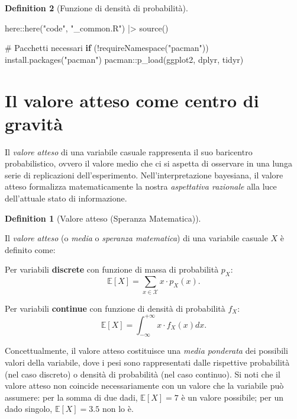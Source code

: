 \documentclass[
  letterpaper,
  DIV=11,
  numbers=noendperiod,
  oneside]{scrreprt}
\newenvironment{Shaded}{\begin{snugshade}}{\end{snugshade}}
\newcommand{\CommentTok}[1]{\textcolor[rgb]{0.37,0.37,0.37}{#1}}
\newcommand{\ControlFlowTok}[1]{\textcolor[rgb]{0.00,0.23,0.31}{\textbf{#1}}}
\newcommand{\FunctionTok}[1]{\textcolor[rgb]{0.28,0.35,0.67}{#1}}
\newcommand{\NormalTok}[1]{\textcolor[rgb]{0.00,0.23,0.31}{#1}}
\newcommand{\SpecialCharTok}[1]{\textcolor[rgb]{0.37,0.37,0.37}{#1}}
\newcommand{\StringTok}[1]{\textcolor[rgb]{0.13,0.47,0.30}{#1}}
\theoremstyle{definition}
\theoremstyle{plain}
\theoremstyle{definition}
\newtheorem{definition}{Definition}[chapter]
\theoremstyle{remark}
\begin{document}
\begin{definition}[Funzione di densità di
probabilità]
\begin{tcolorbox}
\begin{Shaded}
\begin{Highlighting}[]
\NormalTok{here}\SpecialCharTok{::}\FunctionTok{here}\NormalTok{(}\StringTok{"code"}\NormalTok{, }\StringTok{"\_common.R"}\NormalTok{) }\SpecialCharTok{|\textgreater{}} 
  \FunctionTok{source}\NormalTok{()}

\CommentTok{\# Pacchetti necessari}
\ControlFlowTok{if}\NormalTok{ (}\SpecialCharTok{!}\FunctionTok{requireNamespace}\NormalTok{(}\StringTok{"pacman"}\NormalTok{)) }\FunctionTok{install.packages}\NormalTok{(}\StringTok{"pacman"}\NormalTok{)}
\NormalTok{pacman}\SpecialCharTok{::}\FunctionTok{p\_load}\NormalTok{(ggplot2, dplyr, tidyr)}
\end{Highlighting}
\end{Shaded}

\end{tcolorbox}

\section{Il valore atteso come centro di
gravità}\label{il-valore-atteso-come-centro-di-gravituxe0}

Il \emph{valore atteso} di una variabile casuale rappresenta il suo
baricentro probabilistico, ovvero il valore medio che ci si aspetta di
osservare in una lunga serie di replicazioni dell'esperimento.
Nell'interpretazione bayesiana, il valore atteso formalizza
matematicamente la nostra \emph{aspettativa razionale} alla luce
dell'attuale stato di informazione.

\begin{definition}[Valore atteso (Speranza
Matematica)]\protect\hypertarget{def-expected-value}{}\label{def-expected-value}

Il \emph{valore atteso} (o \emph{media} o \emph{speranza matematica}) di
una variabile casuale \(X\) è definito come:

Per variabili \textbf{discrete} con funzione di massa di probabilità
\(p_X\): \[
\mathbb{E}[X] = \sum_{x \in \mathcal{X}} x \cdot p_X(x).
\]

Per variabili \textbf{continue} con funzione di densità di probabilità
\(f_X\): \[
\mathbb{E}[X] = \int_{-\infty}^{+\infty} x \cdot f_X(x)  dx.
\]

\end{definition}

Concettualmente, il valore atteso costituisce una \emph{media ponderata}
dei possibili valori della variabile, dove i pesi sono rappresentati
dalle rispettive probabilità (nel caso discreto) o densità di
probabilità (nel caso continuo). Si noti che il valore atteso non
coincide necessariamente con un valore che la variabile può assumere:
per la somma di due dadi, \(\mathbb{E}[X] = 7\) è un valore possibile;
per un dado singolo, \(\mathbb{E}[X] = 3.5\) non lo è.


\end{definition}
\end{document}

